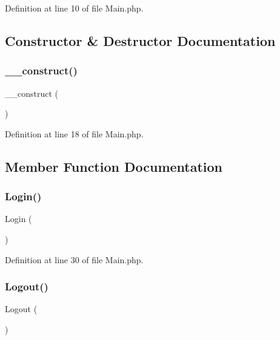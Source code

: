 Definition at line 10 of file Main.\+php.



\subsection{Constructor \& Destructor Documentation}
\mbox{\label{class_src_1_1_controllers_1_1_main_a095c5d389db211932136b53f25f39685}} 
\subsubsection{\+\_\+\+\_\+construct()}
{\footnotesize\ttfamily \+\_\+\+\_\+construct (\begin{DoxyParamCaption}{ }\end{DoxyParamCaption})}



Definition at line 18 of file Main.\+php.



\subsection{Member Function Documentation}
\mbox{\label{class_src_1_1_controllers_1_1_main_a8db48c2902872da0ee80463db6696375}} 
\subsubsection{Login()}
{\footnotesize\ttfamily Login (\begin{DoxyParamCaption}{ }\end{DoxyParamCaption})}



Definition at line 30 of file Main.\+php.

\mbox{\label{class_src_1_1_controllers_1_1_main_aa14f760d541a59acb41ac8eefddafb9b}} 
\subsubsection{Logout()}
{\footnotesize\ttfamily Logout (\begin{DoxyParamCaption}{ }\end{DoxyParamCaption})}




